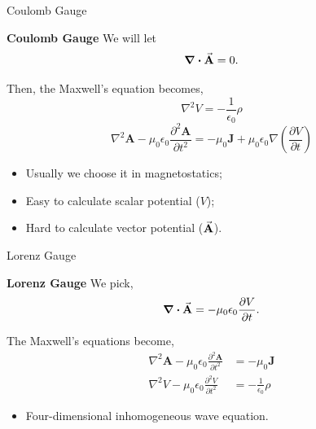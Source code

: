 \documentclass[9pt]{beamer}
\begin{document}
\begin{frame}{Coulomb Gauge}
    \begin{beamerboxesrounded}[shadow=true]{\bf Coulomb Gauge}
        We will let
        \begin{equation*}
            \div\va{A} = 0.
        \end{equation*}
    \end{beamerboxesrounded}

    Then, the Maxwell's equation becomes,
    \begin{equation*}
        \nabla^{2} V=-\frac{1}{\epsilon_{0}} \rho
    \end{equation*}
    \begin{equation*}
        \nabla^{2} \mathbf{A}-\mu_{0} \epsilon_{0} \frac{\partial^{2} \mathbf{A}}{\partial t^{2}}=-\mu_{0} \mathbf{J}+\mu_{0} \epsilon_{0} \nabla\left(\frac{\partial V}{\partial t}\right)
    \end{equation*}

    \begin{itemize}
        \item Usually we choose it in magnetostatics;
        \item Easy to calculate scalar potential ($V$);
        \item Hard to calculate vector potential ($\va{A}$).
    \end{itemize}
\end{frame}

\begin{frame}{Lorenz Gauge}
    \begin{beamerboxesrounded}[shadow=true]{\bf Lorenz Gauge}
        We pick,
        \begin{equation*}
            \div \va{A} = -\mu_0\epsilon_0\pdv{V}{t}.
        \end{equation*}
    \end{beamerboxesrounded}
    The Maxwell's equations become,
    \begin{align*}
        \nabla^{2} \mathbf{A}-\mu_{0} \epsilon_{0} \frac{\partial^{2} \mathbf{A}}{\partial t^{2}} &= -\mu_{0} \mathbf{J} \\ 
        \nabla^{2} V-\mu_{0} \epsilon_{0} \frac{\partial^{2} V}{\partial t^{2}} &= -\frac{1}{\epsilon_{0}} \rho
    \end{align*}
    \begin{itemize}
        \item Four-dimensional inhomogeneous wave equation.
    \end{itemize}
\end{frame}
\end{document}
